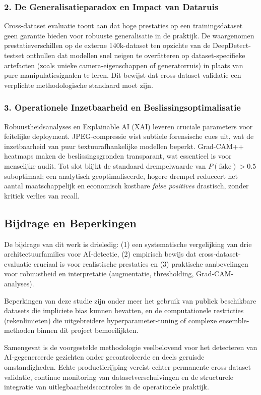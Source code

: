 \subsubsection{2. De Generalisatieparadox en Impact van Dataruis}
Cross-dataset evaluatie toont aan dat hoge prestaties op een trainingsdataset geen garantie bieden voor robuuste generalisatie in de praktijk. De waargenomen prestatieverschillen op de externe 140k-dataset ten opzichte van de DeepDetect-testset onthullen dat modellen snel neigen te overfitteren op dataset-specifieke artefacten (zoals unieke camera-eigenschappen of generatorruis) in plaats van pure manipulatiesignalen te leren. Dit bewijst dat cross-dataset validatie een verplichte methodologische standaard moet zijn.

\subsubsection{3. Operationele Inzetbaarheid en Beslissingsoptimalisatie}
Robuustheidsanalyses en Explainable AI (XAI) leveren cruciale parameters voor feitelijke deployment. JPEG-compressie wist subtiele forensische cues uit, wat de inzetbaarheid van puur textuurafhankelijke modellen beperkt. Grad-CAM++ heatmaps maken de beslissingsgronden transparant, wat essentieel is voor menselijke audit. Tot slot blijkt de standaard drempelwaarde van $P(\text{fake}) > 0.5$ suboptimaal; een analytisch geoptimaliseerde, hogere drempel reduceert het aantal maatschappelijk en economisch kostbare \emph{false positives} drastisch, zonder kritiek verlies van recall.

\subsection{Bijdrage en Beperkingen}
De bijdrage van dit werk is drieledig: (1) een systematische vergelijking van drie architectuurfamilies voor AI-detectie, (2) empirisch bewijs dat cross-dataset-evaluatie cruciaal is voor realistische prestaties en (3) praktische aanbevelingen voor robuustheid en interpretatie (augmentatie, thresholding, Grad-CAM-analyses).

Beperkingen van deze studie zijn onder meer het gebruik van publiek beschikbare datasets die impliciete bias kunnen bevatten, en de computationele restricties (rekenlimieten) die uitgebreidere hyperparameter-tuning of complexe ensemble-methoden binnen dit project bemoeilijkten. 

Samengevat is de voorgestelde methodologie veelbelovend voor het detecteren van AI-gegenereerde gezichten onder gecontroleerde en deels geruisde omstandigheden. Echte productierijping vereist echter permanente cross-dataset validatie, continue monitoring van datasetverschuivingen en de structurele integratie van uitlegbaarheidscontroles in de operationele praktijk.

